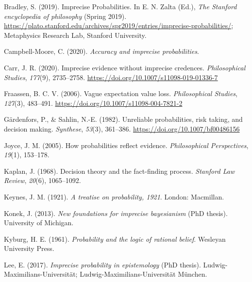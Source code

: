 \documentclass[
  letterpaper,
  DIV=11,
  numbers=noendperiod]{scrartcl}
\newlength{\cslhangindent}
\newlength{\cslentryspacingunit} %
\newenvironment{CSLReferences}[2] %
 {%
  \setlength{\parindent}{0pt}
  \ifodd #1
  \let\oldpar\par
  \def\par{\hangindent=\cslhangindent\oldpar}
  \fi
  \setlength{\parskip}{#2\cslentryspacingunit}
 }%
 {}
\begin{document}
\hypertarget{refs}{}
\begin{CSLReferences}{1}{0}
\leavevmode{}%
Bradley, S. (2019). {Imprecise Probabilities}. In E. N. Zalta (Ed.),
\emph{The {Stanford} encyclopedia of philosophy} ({S}pring 2019).
\url{https://plato.stanford.edu/archives/spr2019/entries/imprecise-probabilities/};
Metaphysics Research Lab, Stanford University.

\leavevmode{}%
Campbell-Moore, C. (2020). \emph{Accuracy and imprecise probabilities}.

\leavevmode{}%
Carr, J. R. (2020). Imprecise evidence without imprecise credences.
\emph{Philosophical Studies}, \emph{177}(9), 2735--2758.
\url{https://doi.org/10.1007/s11098-019-01336-7}

\leavevmode{}%
Fraassen, B. C. V. (2006). Vague expectation value loss.
\emph{Philosophical Studies}, \emph{127}(3), 483--491.
\url{https://doi.org/10.1007/s11098-004-7821-2}

\leavevmode{}%
Gärdenfors, P., \& Sahlin, N.-E. (1982). Unreliable probabilities, risk
taking, and decision making. \emph{Synthese}, \emph{53}(3), 361--386.
\url{https://doi.org/10.1007/bf00486156}

\leavevmode{}%
Joyce, J. M. (2005). How probabilities reflect evidence.
\emph{Philosophical Perspectives}, \emph{19}(1), 153--178.

\leavevmode{}%
Kaplan, J. (1968). Decision theory and the fact-finding process.
\emph{Stanford Law Review}, \emph{20}(6), 1065--1092.

\leavevmode{}%
Keynes, J. M. (1921). \emph{A treatise on probability, 1921}. London:
Macmillan.

\leavevmode{}%
Konek, J. (2013). \emph{New foundations for imprecise bayesianism} (PhD
thesis). University of Michigan.

\leavevmode{}%
Kyburg, H. E. (1961). \emph{Probability and the logic of rational
belief}. Wesleyan University Press.

\leavevmode{}%
Lee, E. (2017). \emph{Imprecise probability in epistemology} (PhD
thesis). Ludwig-Maximilians-Universit{ä}t;
Ludwig-Maximilians-Universität München.


\end{CSLReferences}
\end{document}
